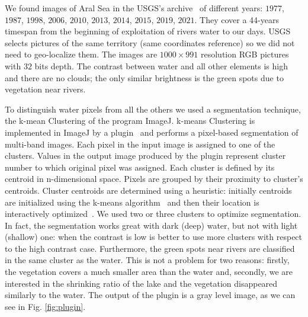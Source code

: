 We found images of Aral Sea in the USGS's archive~\cite{images} of different years: $1977$, $1987$, $1998$, $2006$, $2010$, $2013$, $2014$, $2015$, $2019$, $2021$.
They cover a 44-years timespan from the beginning of exploitation of rivers water to our days. 
USGS selects pictures of the same territory (same coordinates reference) so we did not need to geo-localize them. 
The images are $1000 \times 991$ resolution RGB pictures with $32$ bits depth. 
The contrast between water and all other elements is high and there are no clouds; the only similar brightness is the green spots due to vegetation near rivers.

To distinguish water pixels from all the others we used a segmentation technique, the k-mean Clustering of the program ImageJ. 
k-means Clustering is implemented in ImageJ by a plugin~\cite{plugin} and performs a pixel-based segmentation of multi-band images. 
Each pixel in the input image is assigned to one of the clusters. 
Values in the output image produced by the plugin represent cluster number to which original pixel was assigned. 
Each cluster is defined by its centroid in n-dimensional space. 
Pixels are grouped by their proximity to cluster's centroids. 
Cluster centroids are determined using a heuristic: initially centroids are initialized using the k-means algorithm~\cite{kmeans} and then their location is interactively optimized~\cite{plugin}.
We used two or three clusters to optimize segmentation. 
In fact, the segmentation works great with dark (deep) water, but not with light (shallow) one: when the contrast is low is better to use more clusters with respect to the high contrast case. 
Furthermore, the green spots near rivers are classified in the same cluster as the water. 
This is not a problem for two reasons: firstly, the vegetation covers a much smaller area than the water and, secondly, we are interested in the shrinking ratio of the lake and the vegetation disappeared similarly to the water. 
The output of the plugin is a gray level image, as we can see in Fig. \ref{fig:plugin}.
